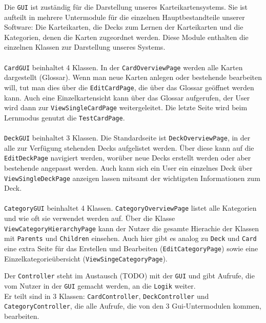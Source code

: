 \documentclass[fontsize=12pt,paper=A4,twoside]{scrartcl}
\begin{document}
     
    Die \texttt{GUI} ist zuständig für die Darstellung unseres Karteikartensystems.
    Sie ist aufteilt in mehrere Untermodule für die einzelnen Hauptbestandteile 
    unserer Software: Die Karteikarten, die Decks zum Lernen der Karteikarten und die Kategorien, 
    denen die Karten zugeordnet werden. Diese Module enthalten die einzelnen Klassen zur Darstellung
    unseres Systems.\\\\
     \texttt{CardGUI} beinhaltet 4 Klassen. In der \texttt{CardOverviewPage} werden
    alle Karten dargestellt (Glossar). Wenn man neue Karten anlegen oder bestehende bearbeiten will, tut 
    man dies über die \texttt{EditCardPage}, die über das Glossar geöffnet werden kann. Auch eine Einzelkartensicht
    kann über das Glossar aufgerufen, der User wird dann zur \texttt{ViewSingleCardPage} weitergeleitet.
    Die letzte Seite wird beim Lernmodus genutzt die \texttt{TestCardPage}.\\\\
     \texttt{DeckGUI} beinhaltet 3 Klassen. Die Standardseite ist \texttt{DeckOverviewPage}, 
    in der alle zur Verfügung stehenden Decks aufgelistet werden. Über diese kann auf die \texttt{EditDeckPage} 
    navigiert werden, worüber neue Decks erstellt werden oder aber bestehende angepasst werden. Auch kann sich ein
    User ein einzelnes Deck über \texttt{ViewSingleDeckPage} anzeigen lassen mitsamt der wichtigsten Informationen 
    zum Deck.\\\\
     \texttt{CategoryGUI} beinhaltet 4 Klassen. \texttt{CategoryOverviewPage} listet alle Kategorien
    und wie oft sie verwendet werden auf. Über die Klasse \texttt{ViewCategoryHierarchyPage} kann 
    der Nutzer die gesamte Hierachie der Klassen mit \texttt{Parents} und \texttt{Children} einsehen.
    Auch hier gibt es analog zu \texttt{Deck} und \texttt{Card} eine extra Seite für das Erstellen und Bearbeiten 
    (\texttt{EditCategoryPage}) sowie eine Einzelkategorieübersicht (\texttt{ViewSingeCategoryPage}).
   
    Der \texttt{Controller} steht im Austausch (TODO) mit der \texttt{GUI} und gibt Aufrufe, die vom Nutzer 
    in der \texttt{GUI} gemacht werden, an die \texttt{Logik} weiter.\\
    Er teilt sind in 3 Klassen: \texttt{CardController}, \texttt{DeckController} und \texttt{CategoryController}, die alle Aufrufe, die von den 3 Gui-Untermodulen kommen, bearbeiten.
   
\end{document}
